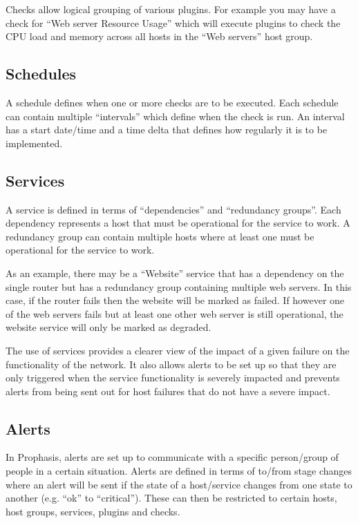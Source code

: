 \documentclass[bsc,deptreport,twoside,parskip,singlespacing,notimes]{infthesis}
\begin{document}
	Checks allow logical grouping of various plugins.  For example you may have a
	check for ``Web server Resource Usage'' which will execute plugins to check the
	CPU load and memory across all hosts in the ``Web servers'' host group.

\subsection{Schedules}
\label{methodology-schedules}

	A schedule defines when one or more checks are to be executed.  Each schedule
	can contain multiple ``intervals'' which define when the check is run.  An
	interval has a start date/time and a time delta that defines how regularly it
	is to be implemented.

\subsection{Services}
\label{methodology-services}

	A service is defined in terms of ``dependencies'' and ``redundancy groups''. Each
	dependency represents a host that must be operational for the service to work.
	A redundancy group can contain multiple hosts where at least one must be
	operational for the service to work.


	As an example, there may be a ``Website'' service that has a dependency on the
	single router but has a redundancy group containing multiple web servers.
	In this case, if the router fails then the website will be marked as failed.
	If however one of the web servers fails but at least one other web server is
	still operational, the website service will only be marked as degraded.


	The use of services provides a clearer view of the impact of a given failure on
	the functionality of the network.  It also allows alerts to be set up so that
	they are only triggered when the service functionality is severely impacted and
	prevents alerts from being sent out for host failures that do not have a severe
	impact.

\subsection{Alerts}

	In Prophasis, alerts are set up to communicate with a specific person/group of
	people in a certain situation.  Alerts are defined in terms of to/from stage
	changes where an alert will be sent if the state of a host/service changes from
	one state to another (e.g. ``ok'' to ``critical'').  These can then be restricted
	to certain hosts, host groups, services, plugins and checks.
\end{document}
